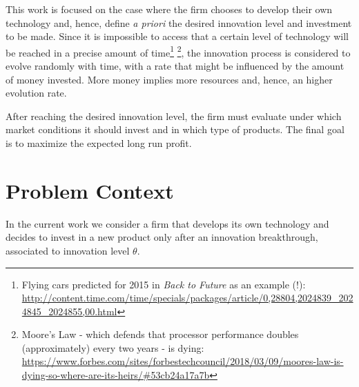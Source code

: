 This work is focused on the case where the firm chooses to develop their own technology and, hence, define \textit{a priori} the desired innovation level and investment to be made. Since it is impossible to access that a certain level of technology will be reached in a precise amount of time\footnote{Flying cars predicted for 2015 in \textit{Back to Future} as an example (!):\\  \url{http://content.time.com/time/specials/packages/article/0,28804,2024839_2024845_2024855,00.html}} \footnote{Moore's Law - which defends that processor performance doubles (approximately) every two years - is dying:\\
\url{https://www.forbes.com/sites/forbestechcouncil/2018/03/09/moores-law-is-dying-so-where-are-its-heirs/\#53cb24a17a7b}}, the innovation process is considered to evolve randomly with time, with a rate that might be influenced by the amount of money invested. More money implies more resources and, hence, an higher evolution rate.

After %
reaching the desired innovation level, the firm must evaluate under which market conditions it should invest and in which type of products. The final goal is to maximize the expected long run profit.




\section{Problem Context}
\label{section:context}

In the current work we consider a firm that develops its own technology and decides to invest in a new product only after an innovation breakthrough, associated to innovation level $\theta$.


